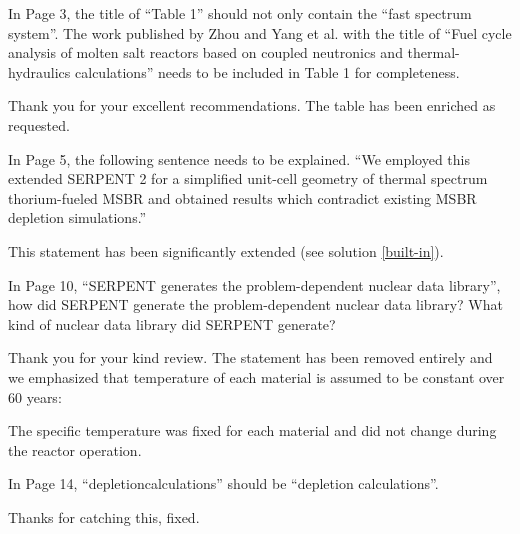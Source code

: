\documentclass[answers,11pt]{exam}
\begin{document}
\begin{questions}
        \question  In Page 3, the title of ``Table 1'' should not only contain 
        the ``fast spectrum system''. The work published by Zhou and Yang et al. 
        with the title of ``Fuel cycle analysis of molten salt reactors based on 
        coupled neutronics and thermal-hydraulics calculations'' needs to be 
        included in Table 1 for completeness.
        \begin{solution}
                Thank you for your excellent recommendations. The table has been 
                enriched as requested.
        \end{solution}

        \question  In Page 5, the following sentence needs to be explained. ``We 
        employed this extended SERPENT 2 for a simplified unit-cell geometry of 
        thermal spectrum thorium-fueled MSBR and obtained results which 
        contradict existing MSBR depletion simulations.''
        \begin{solution}
                This statement has been significantly extended (see solution 
                \ref{built-in}).
        \end{solution}

        \question  In Page 10, ``SERPENT generates the problem-dependent nuclear 
        data library'', how did SERPENT generate the problem-dependent nuclear 
        data library? What kind of nuclear data library did SERPENT generate?
        \begin{solution}
                Thank you for your kind review. The statement has been removed
		        entirely and we emphasized that temperature of each material is 
		        assumed to be constant over 60 years:
		        
		        The specific temperature was fixed for each material and did 
		        not change during the reactor operation. 
        \end{solution}

        \question  In Page 14, ``depletioncalculations'' should be ``depletion 
        calculations''.
        \begin{solution}
                Thanks for catching this, fixed.
        \end{solution}


\end{questions}
\end{document}
